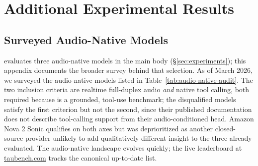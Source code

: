 \section{Additional Experimental Results}
\label{app:results}

\subsection{Surveyed Audio-Native Models}\label{app:audio-native-audit}

\tauvoice{} evaluates three audio-native models in the main body (\S\ref{sec:experiments}); this appendix documents the broader survey behind that selection. As of March 2026, we surveyed the audio-native models listed in Table~\ref{tab:audio-native-audit}. The two inclusion criteria are realtime full-duplex audio \emph{and} native tool calling, both required because \tauvoice{} is a grounded, tool-use benchmark; the disqualified models satisfy the first criterion but not the second, since their published documentation does not describe tool-calling support from their audio-conditioned head. Amazon Nova 2 Sonic qualifies on both axes but was deprioritized as another closed-source provider unlikely to add qualitatively different insight to the three already evaluated. The audio-native landscape evolves quickly; the live leaderboard at \href{https://taubench.com}{taubench.com} tracks the canonical up-to-date list.%

